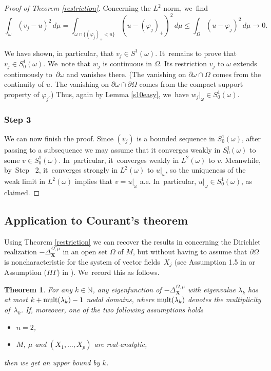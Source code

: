 \documentclass[10pt]{amsart}
\newcommand{\mult}{\textup{mult}}
\newcommand{\bX}{{\boldsymbol{X}}}
\newtheorem{theorem}{Theorem}[section]
\theoremstyle{definition}
\let\phi\varphi
\let\Xb\bX
\newcommand{\1}{\mathbbm{1}}
\begin{document}
\begin{proof}[Proof of Theorem \ref{restriction}]
Concerning the $L^2$-norm, we~find
\[
\int_\omega (v_j - u)^2\,d\mu = \int_{\omega\cap\{ (\phi_j)_+< u\}} (u - (\phi_j)_+)^2\,d\mu
\leq \int_\Omega (u-\phi_j)^2\,d\mu \to 0.
\]

We have shown, in particular, that $v_j\in S^1(\omega)$. It~remains to prove that $v_j\in S^1_0(\omega)$. We~note that $w_j$ is continuous in $\Omega$. Its restriction $v_j$ to $\omega$ extends continuously to~$\partial\omega$ and vanishes there. (The vanishing on $\partial\omega\cap\Omega$ comes from the continuity of $u$. The vanishing on $\partial\omega\cap\partial\Omega$ comes from the compact support property of $\phi_j$.) Thus, again by Lemma \ref{s10easy}, we~have $w_j|_\omega\in S^1_0(\omega)$.

\subsubsection*{Step 3} We can now finish the proof. Since $(v_j)$ is a bounded sequence in $S^1_0(\omega)$, after passing to a subsequence we may assume that it converges weakly in $S^1_0(\omega)$ to some $v\in S^1_0(\omega)$. In~particular, it~converges weakly in $L^2(\omega)$ to $v$. Meanwhile, by~Step~ 2, it~converges strongly in $L^2(\omega)$ to $u|_\omega$, so the uniqueness of the weak limit in $L^2(\omega)$ implies that $v=u|_\omega$ a.e. In~particular, $u|_\omega\in S^1_0(\omega)$, as claimed.
\end{proof}

\subsection{Application to Courant's theorem}\label{ss2.7}
Using Theorem \ref{restriction} we can recover the results in \cite{EL} concerning the Dirichlet realization $-\Delta^{\Omega,\mu}_\Xb$ in an open set $\Omega$ of $M$, but without having to assume that $\partial \Omega$ is noncharacteristic for the system of vector fields~$X_j$ (see Assumption 1.5 in \cite{EL} or Assumption ($H\Gamma$) in \cite{De}). We~record this as follows.

\begin{theorem}\label{courant}
For any $k\in \mathbb N$, any eigenfunction of $-\Delta_\Xb^{\Omega,\mu}$ with eigenvalue $\lambda_k$ has at most
$k+ \mult(\lambda_k)-1$ nodal domains, where $\mult(\lambda_k)$ denotes the multiplicity of~$\lambda_k$.
If, moreover, one of the two following assumptions holds
\begin{itemize}
\item $n=2$,
\item $M$, $\mu$ and $(X_1,\dots, X_p)$ are real-analytic,
\end{itemize}
then we get an upper bound by $k$.
\end{theorem}
\end{document}
